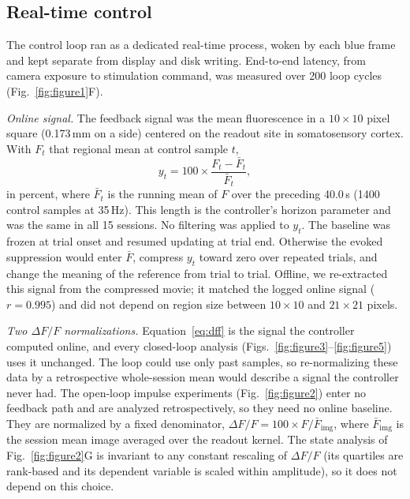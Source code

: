 \subsection*{Real-time control}

The control loop ran as a dedicated real-time process, woken by each blue frame
and kept separate from display and disk writing. End-to-end latency, from camera
exposure to stimulation command, was measured over 200 loop cycles
(Fig.~\ref{fig:figure1}F).

\emph{Online signal.} The feedback signal was the mean fluorescence in a
$10 \times 10$ pixel square (0.173\,mm on a side) centered on the readout site
in somatosensory cortex. With $F_t$ that regional mean at control sample $t$,
%
\begin{equation}
    y_{t} = 100 \times \frac{F_{t} - \bar{F}_{t}}{\bar{F}_{t}},
    \label{eq:dff}
\end{equation}
%
in percent, where $\bar{F}_{t}$ is the running mean of $F$ over the preceding
40.0\,s (1400 control samples at 35\,Hz). This length is the controller's
horizon parameter and was the same in all 15 sessions. No filtering was applied
to $y_t$. The baseline was frozen at trial onset and resumed updating at trial
end. Otherwise the evoked suppression would enter $\bar F$, compress $y_t$
toward zero over repeated trials, and change the meaning of the reference from
trial to trial. Offline, we re-extracted this signal from the compressed movie;
it matched the logged online signal ($r = 0.995$) and did not depend on region
size between $10 \times 10$ and $21 \times 21$ pixels.

\emph{Two $\Delta F/F$ normalizations.} Equation~\eqref{eq:dff} is the signal
the controller computed online, and every closed-loop analysis
(Figs.~\ref{fig:figure3}--\ref{fig:figure5}) uses it unchanged. The loop could
use only past samples, so re-normalizing these data by a retrospective
whole-session mean would describe a signal the controller never had. The
open-loop impulse experiments (Fig.~\ref{fig:figure2}) enter no feedback path
and are analyzed retrospectively, so they need no online baseline. They are
normalized by a fixed denominator, $\Delta F/F = 100 \times F /
\bar{F}_{\mathrm{img}}$, where $\bar{F}_{\mathrm{img}}$ is the session mean image
averaged over the readout kernel. The state analysis of Fig.~\ref{fig:figure2}G
is invariant to any constant rescaling of $\Delta F/F$ (its quartiles are
rank-based and its dependent variable is scaled within amplitude), so it does
not depend on this choice.

